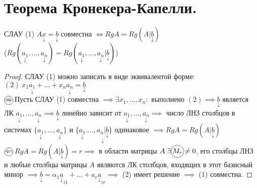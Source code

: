 \documentclass[../main.tex]{subfiles}
\begin{document}
\section{Теорема Кронекера-Капелли.}
\begin{theorem}
    СЛАУ (1) $A\underset{\downarrow}{x}=\underset{\downarrow}{b}$ совместна $\Leftrightarrow RgA = Rg(A|\underset{\downarrow}{b})$
    \\($Rg(\underset{\downarrow}{a_{1}},\dots,\underset{\downarrow}{a_{n}})=Rg(\underset{\downarrow}{a_{1}},\dots,\underset{\downarrow}{a_{n}}|\underset{\downarrow}{b})$)

\end{theorem}
\begin{proof}
    СЛАУ (1) можно записать в виде эквивалентой форме: $(2) \; x_{1} \underset{\downarrow}{a_{1}}+\dots+x_{n}\underset{\downarrow}{a_{n}}=\underset{\downarrow}{b}$    
    \\ $\tcircle{$\implies$}$ Пусть СЛАУ (1) совместна $\implies \exists x_{1},\dots,x_{n}: $ выполнено $(2)\implies\underset{\downarrow}{b}$ является ЛК $\underset{\downarrow}{a_{1}},\dots,\underset{\downarrow}{a_{n}} \implies \underset{\downarrow}{b}$ линейно зависит от $\underset{\downarrow}{a_{1}},\dots,\underset{\downarrow}{a_{n}}\implies $ число ЛНЗ столбцов в системах $\{\underset{\downarrow}{a_{1}},\dots,\underset{\downarrow}{a_{n}}\}$ и $\{\underset{\downarrow}{a_{1}}.\dots,\underset{\downarrow}{a_{n}|\underset{\downarrow}{b}}\} $ одинаковое $\implies RgA=Rg(A|\underset{\downarrow}{b})$
    \\ $\tcircle{$\impliedby$}$ \;$RgA=Rg(A|\underset{\downarrow}{b})=r\implies$ в области матрицы $A\; \exists \tcircle{$M_{r}$}\neq 0$, его столбцы ЛНЗ и любые столбцы матрицы $A$ являются ЛК столбцов, входящих в этот базисный минор $\implies \underset{\downarrow}{b}=\alpha_{1}\underset{\downarrow}{a}_{i1}+\dots+a_{r}\underset{\downarrow}{a}_{ir}\implies$ (2) имеет решение $\implies $ (1) совместна.  
\end{proof}
\end{document}
